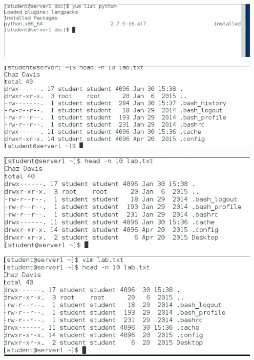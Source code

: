\documentclass[../CIT217_RHEL124_LabJournal.tex]{subfiles}
\begin{document}

\begin{center}
	\includegraphics[scale=0.3]{Figures/2020-01-30-152624_1137x246_scrot.png}
\end{center}

\newpage



\begin{center}
	\includegraphics[scale=0.2]{Figures/2020-01-30-154010_939x313_scrot.png}
\end{center}



\begin{center}
	\includegraphics[scale=0.2]{Figures/2020-01-30-154359_879x324_scrot.png}
\end{center}


\begin{center}
	\includegraphics[scale=0.2]{Figures/2020-01-30-154746_892x361_scrot.png}
\end{center}

\end{document}
